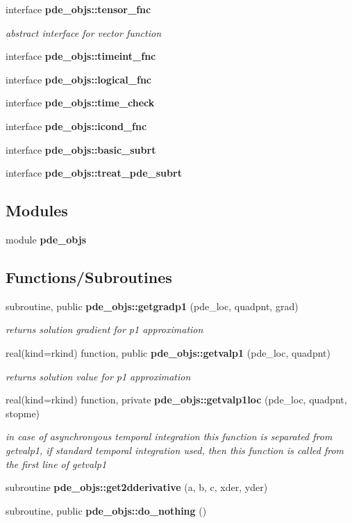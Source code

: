 \begin{DoxyCompactItemize}
interface {\bf pde\+\_\+objs\+::tensor\+\_\+fnc}
\begin{DoxyCompactList}\small\item\em abstract interface for vector function \end{DoxyCompactList}\item 
interface {\bf pde\+\_\+objs\+::timeint\+\_\+fnc}
\item 
interface {\bf pde\+\_\+objs\+::logical\+\_\+fnc}
\item 
interface {\bf pde\+\_\+objs\+::time\+\_\+check}
\item 
interface {\bf pde\+\_\+objs\+::icond\+\_\+fnc}
\item 
interface {\bf pde\+\_\+objs\+::basic\+\_\+subrt}
\item 
interface {\bf pde\+\_\+objs\+::treat\+\_\+pde\+\_\+subrt}
\end{DoxyCompactItemize}
\subsection*{Modules}
\begin{DoxyCompactItemize}
\item 
module {\bf pde\+\_\+objs}
\end{DoxyCompactItemize}
\subsection*{Functions/\+Subroutines}
\begin{DoxyCompactItemize}
\item 
subroutine, public {\bf pde\+\_\+objs\+::getgradp1} (pde\+\_\+loc, quadpnt, grad)
\begin{DoxyCompactList}\small\item\em returns solution gradient for p1 approximation \end{DoxyCompactList}\item 
real(kind=rkind) function, public {\bf pde\+\_\+objs\+::getvalp1} (pde\+\_\+loc, quadpnt)
\begin{DoxyCompactList}\small\item\em returns solution value for p1 approximation \end{DoxyCompactList}\item 
real(kind=rkind) function, private {\bf pde\+\_\+objs\+::getvalp1loc} (pde\+\_\+loc, quadpnt, stopme)
\begin{DoxyCompactList}\small\item\em in case of asynchronyous temporal integration this function is separated from getvalp1, if standard temporal integration used, then this function is called from the first line of getvalp1 \end{DoxyCompactList}\item 
subroutine {\bf pde\+\_\+objs\+::get2dderivative} (a, b, c, xder, yder)
\item 
subroutine, public {\bf pde\+\_\+objs\+::do\+\_\+nothing} ()
\end{DoxyCompactItemize}
